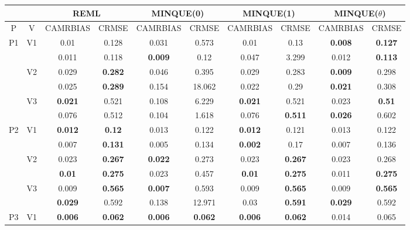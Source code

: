 \documentclass[12pt,a4paper]{article}
\begin{document}
\begin{sidewaystable}[ht]
\centering
{\footnotesize
\begin{tabular}{cc|cc|cc|cc|cc|}
   & & \multicolumn{2}{c|}{REML}&\multicolumn{2}{c|}{MINQUE(0)}&\multicolumn{2}{c|}{MINQUE(1)}&\multicolumn{2}{c|}{MINQUE($\theta$)}\\ \hline
P & V & CAMRBIAS & CRMSE & CAMRBIAS & CRMSE & CAMRBIAS & CRMSE & CAMRBIAS & CRMSE \\ 
  \hline
\multirow{6}{*}{P1} & \multirow{2}{*}{V1} & 0.01 & 0.128 & 0.031 & 0.573 & 0.01 & 0.13 & \textbf{0.008} & \textbf{0.127} \\ 
   &  & 0.011 & 0.118 & \textbf{0.009} & 0.12 & 0.047 & 3.299 & 0.012 & \textbf{0.113} \\ 
   & \multirow{2}{*}{V2} & 0.029 & \textbf{0.282} & 0.046 & 0.395 & 0.029 & 0.283 & \textbf{0.009} & 0.298 \\ 
   &  & 0.025 & \textbf{0.289} & 0.154 & 18.062 & 0.022 & 0.29 & \textbf{0.021} & 0.308 \\ 
   & \multirow{2}{*}{V3} & \textbf{0.021} & 0.521 & 0.108 & 6.229 & \textbf{0.021} & 0.521 & 0.023 & \textbf{0.51} \\ 
   &  & 0.076 & 0.512 & 0.104 & 1.618 & 0.076 & \textbf{0.511} & \textbf{0.026} & 0.602 \\ 
   \hline \hline\multirow{6}{*}{P2} & \multirow{2}{*}{V1} & \textbf{0.012} & \textbf{0.12} & 0.013 & 0.122 & \textbf{0.012} & 0.121 & 0.013 & 0.122 \\ 
   &  & 0.007 & \textbf{0.131} & 0.005 & 0.134 & \textbf{0.002} & 0.17 & 0.007 & 0.136 \\ 
   & \multirow{2}{*}{V2} & 0.023 & \textbf{0.267} & \textbf{0.022} & 0.273 & 0.023 & \textbf{0.267} & 0.023 & 0.268 \\ 
   &  & \textbf{0.01} & \textbf{0.275} & 0.023 & 0.457 & \textbf{0.01} & \textbf{0.275} & 0.011 & \textbf{0.275} \\ 
   & \multirow{2}{*}{V3} & 0.009 & \textbf{0.565} & \textbf{0.007} & 0.593 & 0.009 & \textbf{0.565} & 0.009 & \textbf{0.565} \\ 
   &  & \textbf{0.029} & 0.592 & 0.138 & 12.971 & 0.03 & \textbf{0.591} & \textbf{0.029} & 0.592 \\ 
   \hline \hline\multirow{6}{*}{P3} & \multirow{2}{*}{V1} & \textbf{0.006} & \textbf{0.062} & \textbf{0.006} & \textbf{0.062} & \textbf{0.006} & \textbf{0.062} & 0.014 & 0.065 \\ 

\end{tabular}}
\end{sidewaystable}
\end{document}
